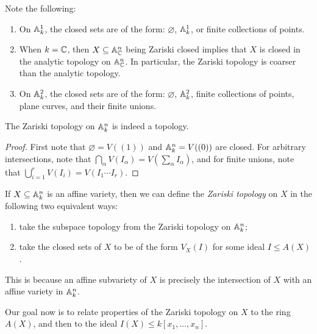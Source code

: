 \begin{remark}
  Note the following:
  \begin{enumerate}
    \item On $\mathbb{A}_k^1$, the closed
      sets are of the form: $\varnothing$,
      $\mathbb{A}_k^1$, or finite collections
      of points.
    \item When $k = \mathbb{C}$, then
      $X \subseteq \mathbb{A}_{\mathbb{C}}^n$ being
      Zariski closed implies that
      $X$ is closed in the analytic
      topology on $\mathbb{A}_{\mathbb{C}}^n$.
      In particular, the Zariski topology
      is coarser than the analytic topology.
    \item On $\mathbb{A}_k^2$, the closed
      sets are of the form:
      $\varnothing$, $\mathbb{A}_k^2$,
      finite collections of points, plane
      curves, and their finite unions.
  \end{enumerate}
\end{remark}

\begin{prop}
  The Zariski topology on $\mathbb{A}_k^n$
  is indeed a topology.
\end{prop}

\begin{proof}
  First note that $\varnothing = V((1))$ and
  $\mathbb{A}_k^n = V((0))$ are closed.
  For arbitrary intersections, note
  that $\bigcap_\alpha V(I_\alpha) = V(\sum_\alpha I_\alpha)$, and
  for finite unions, note that
  $\bigcup_{i = 1}^r V(I_i) = V(I_1 \cdots I_r)$.
\end{proof}

\begin{definition}
  If $X \subseteq \mathbb{A}_k^n$ is
  an affine variety, then we can define the
  \emph{Zariski topology} on $X$ in
  the following two equivalent ways:
  \begin{enumerate}
    \item take the subspace topology
      from the Zariski topology on
      $\mathbb{A}_k^n$;
    \item take the closed
      sets of $X$ to be of the form
      $V_X(I)$ for some ideal $I \le A(X)$.
  \end{enumerate}
  This is because an affine subvariety
  of $X$ is precisely the
  intersection of $X$ with an affine
  variety in $\mathbb{A}_k^n$.
\end{definition}

\begin{remark}
  Our goal now is to relate properties
  of the Zariski topology on $X$ to the
  ring $A(X)$,
  and then to the ideal $I(X) \le k[x_1, \dots, x_n]$.
\end{remark}

